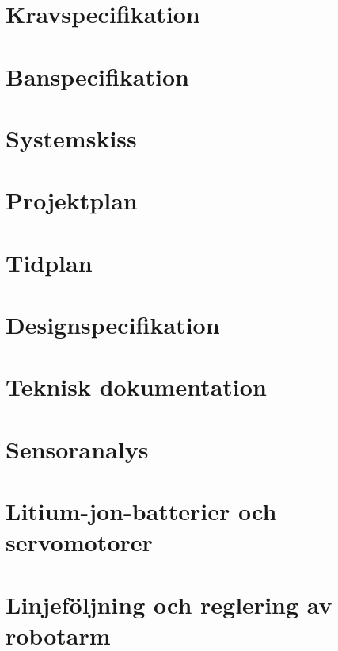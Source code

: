 

\section{Kravspecifikation}
\label{sec:kravspec}

\section{Banspecifikation}
\label{sec:banspec}

\section{Systemskiss}
\label{sec:systemskiss}

\section{Projektplan}
\label{sec:projektplan}

\section{Tidplan}
\label{sec:tidplan}

\section{Designspecifikation}
\label{sec:designspec}

\section{Teknisk dokumentation}
\label{sec:tekdok}

\section{Sensoranalys}
\label{sec:sensoruppgift}

\section{Litium-jon-batterier och servomotorer}
\label{sec:batteriservouppgift}

\section{Linjeföljning och reglering av robotarm}
\label{sec:regleruppgift}


